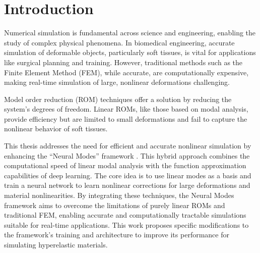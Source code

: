 \documentclass[11pt,a4paper,twocolumn]{article}
\begin{document}




\section{Introduction}
\label{sec:es:introduction}

Numerical simulation is fundamental across science and engineering, enabling the study of complex physical phenomena. In biomedical engineering, accurate simulation of deformable objects, particularly soft tissues, is vital for applications like surgical planning and training. However, traditional methods such as the Finite Element Method (FEM), while accurate, are computationally expensive, making real-time simulation of large, nonlinear deformations challenging.

Model order reduction (ROM) techniques offer a solution by reducing the system's degrees of freedom. Linear ROMs, like those based on modal analysis, provide efficiency but are limited to small deformations and fail to capture the nonlinear behavior of soft tissues.

This thesis addresses the need for efficient and accurate nonlinear simulation by enhancing the ``Neural Modes'' framework \cite{Wang_Du_Coros_Thomaszewski_2024}. This hybrid approach combines the computational speed of linear modal analysis with the function approximation capabilities of deep learning. The core idea is to use linear modes as a basis and train a neural network to learn nonlinear corrections for large deformations and material nonlinearities. By integrating these techniques, the Neural Modes framework aims to overcome the limitations of purely linear ROMs and traditional FEM, enabling accurate and computationally tractable simulations suitable for real-time applications. This work proposes specific modifications to the framework's training and architecture to improve its performance for simulating hyperelastic materials.
\end{document}
